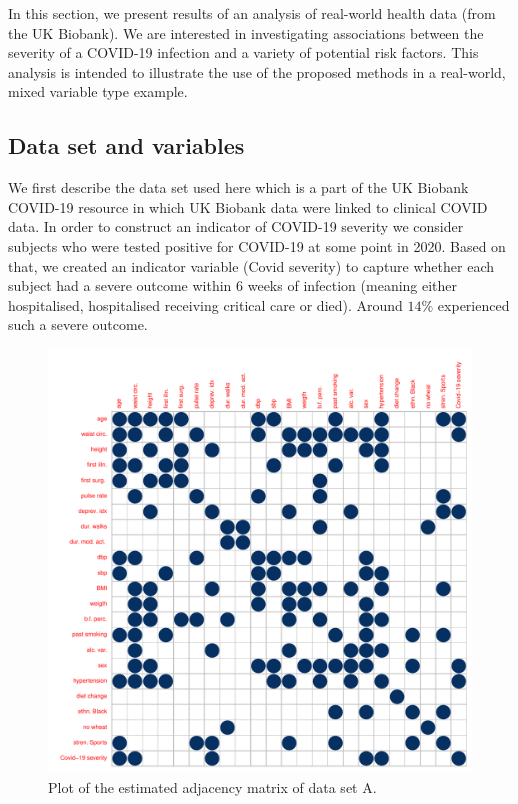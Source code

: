
In this section, we present results of an analysis of real-world health data (from the UK Biobank). We are interested in investigating associations between the severity of a COVID-19 infection and a variety of potential risk factors.
This analysis is intended to illustrate the use of the proposed methods in a real-world, mixed variable type example. 


\subsection{Data set and variables}

We first describe the data set used here which is a part of the UK Biobank COVID-19 resource in which UK Biobank data were linked to clinical COVID data. In order to construct an indicator of COVID-19 severity we consider subjects who were tested positive for COVID-19 at some point in 2020.  Based on that, we created an indicator variable (Covid severity) to capture whether each subject had a severe outcome within 6 weeks of infection (meaning either hospitalised, hospitalised receiving critical care or died). Around $14\%$ experienced such a severe outcome. \begin{figure}[ht]
    \centering
    \includegraphics[scale=.6]{Figures/corrplot_admat_A.pdf}
    \caption{Plot of the estimated adjacency matrix of data set A.}
    \label{fig:corrplot_admat_A}
\end{figure}
